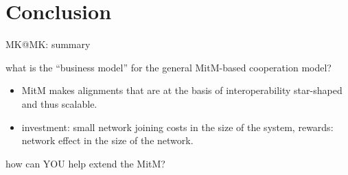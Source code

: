 \section{Conclusion}\label{sec:concl}
\begin{todolist}{MK@MK: summary}
\item what is the ``business model'' for the general MitM-based cooperation model?
  \begin{itemize}
  \item MitM makes alignments that are at the basis of interoperability star-shaped and
    thus scalable.
  \item investment: small network joining costs in the size of the system, rewards:
    network effect in the size of the network.
  \end{itemize}
\item how can YOU help extend the MitM?
\end{todolist}


